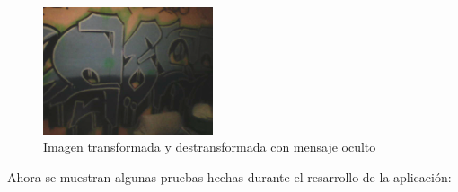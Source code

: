 \documentclass[12pt]{article}
\begin{document}
\newline
\begin{figure}[hbtp]
\centering
\includegraphics[width = 5cm]{chois3.png}
\caption{Imagen transformada y destransformada con mensaje oculto}
\end{figure}
\newline

Ahora se muestran algunas pruebas hechas durante el resarrollo de la aplicación:
\newline
\end{document}
